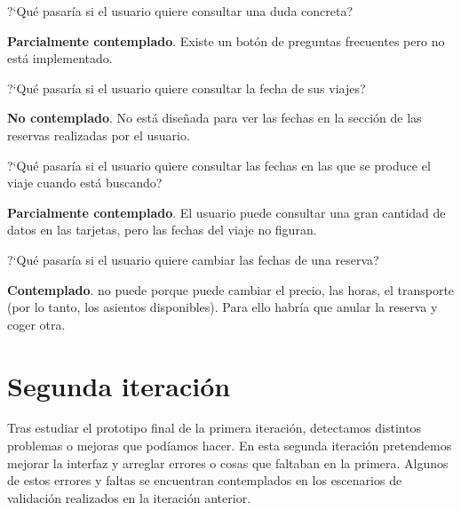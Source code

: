 \begin{escenario} %
      \centering
      ?`Qué pasaría si el usuario quiere consultar una duda concreta?

      \begin{solucion}
            \centering
            \textbf{Parcialmente contemplado}. Existe un botón de preguntas frecuentes pero no está implementado.
      \end{solucion}
\end{escenario}

\begin{escenario} %
    \centering
?`Qué pasaría si el usuario quiere consultar la fecha de sus viajes?

\begin{solucion}
    \centering
    \textbf{No contemplado}. No está diseñada para ver las fechas en la sección de las reservas realizadas por el usuario.
\end{solucion}
\end{escenario}

\begin{escenario} %
    \centering
?`Qué pasaría si el usuario quiere consultar las fechas en las que se produce el viaje cuando está buscando?

\begin{solucion}
    \centering
    \textbf{Parcialmente contemplado}. El usuario puede consultar una gran cantidad de datos en las tarjetas, pero las fechas del viaje no figuran.
\end{solucion}
\end{escenario}

\begin{escenario} %
    \centering
?`Qué pasaría si el usuario quiere cambiar las fechas de una reserva?

\begin{solucion}
    \centering
    \textbf{Contemplado}. no puede porque puede cambiar el precio, las horas, el transporte (por lo tanto, los asientos disponibles). Para ello habría que anular la reserva y coger otra.
\end{solucion}
\end{escenario}


\section{Segunda iteración}
Tras estudiar el prototipo final de la primera iteración, detectamos distintos problemas o mejoras que podíamos hacer. En esta segunda iteración pretendemos 
mejorar la interfaz y arreglar errores o cosas que faltaban en la primera. Algunos de estos errores y faltas se encuentran contemplados en los escenarios de validación
realizados en la iteración anterior. \\

